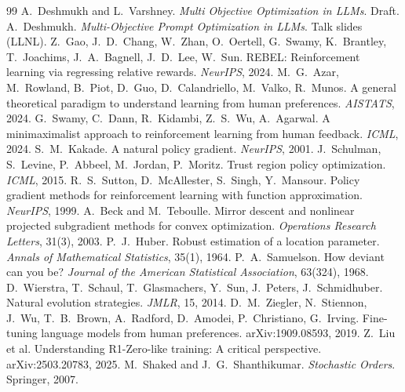 \documentclass[11pt]{article}
\theoremstyle{definition}
\theoremstyle{remark}
\newcommand{\1}{\mathbb{1}}
\begin{document}
\begin{thebibliography}{99}\small
{} A.~Deshmukh and L.~Varshney. \emph{Multi Objective Optimization in LLMs}. Draft.
 A.~Deshmukh. \emph{Multi-Objective Prompt Optimization in LLMs}. Talk slides (LLNL).
 Z.~Gao, J.~D.~Chang, W.~Zhan, O.~Oertell, G.~Swamy, K.~Brantley, T.~Joachims, J.~A.~Bagnell, J.~D.~Lee, W.~Sun. REBEL: Reinforcement learning via regressing relative rewards. \emph{NeurIPS}, 2024.
 M.~G.~Azar, M.~Rowland, B.~Piot, D.~Guo, D.~Calandriello, M.~Valko, R.~Munos. A general theoretical paradigm to understand learning from human preferences. \emph{AISTATS}, 2024.
 G.~Swamy, C.~Dann, R.~Kidambi, Z.~S.~Wu, A.~Agarwal. A minimaximalist approach to reinforcement learning from human feedback. \emph{ICML}, 2024.
 S.~M.~Kakade. A natural policy gradient. \emph{NeurIPS}, 2001.
 J.~Schulman, S.~Levine, P.~Abbeel, M.~Jordan, P.~Moritz. Trust region policy optimization. \emph{ICML}, 2015.
 R.~S.~Sutton, D.~McAllester, S.~Singh, Y.~Mansour. Policy gradient methods for reinforcement learning with function approximation. \emph{NeurIPS}, 1999.
 A.~Beck and M.~Teboulle. Mirror descent and nonlinear projected subgradient methods for convex optimization. \emph{Operations Research Letters}, 31(3), 2003.
 P.~J.~Huber. Robust estimation of a location parameter. \emph{Annals of Mathematical Statistics}, 35(1), 1964.
 P.~A.~Samuelson. How deviant can you be? \emph{Journal of the American Statistical Association}, 63(324), 1968.
 D.~Wierstra, T.~Schaul, T.~Glasmachers, Y.~Sun, J.~Peters, J.~Schmidhuber. Natural evolution strategies. \emph{JMLR}, 15, 2014.
 D.~M.~Ziegler, N.~Stiennon, J.~Wu, T.~B.~Brown, A.~Radford, D.~Amodei, P.~Christiano, G.~Irving. Fine-tuning language models from human preferences. arXiv:1909.08593, 2019.
 Z.~Liu et al. Understanding R1-Zero-like training: A critical perspective. arXiv:2503.20783, 2025.
 M.~Shaked and J.~G.~Shanthikumar. \emph{Stochastic Orders}. Springer, 2007.
\end{thebibliography}
\end{document}
